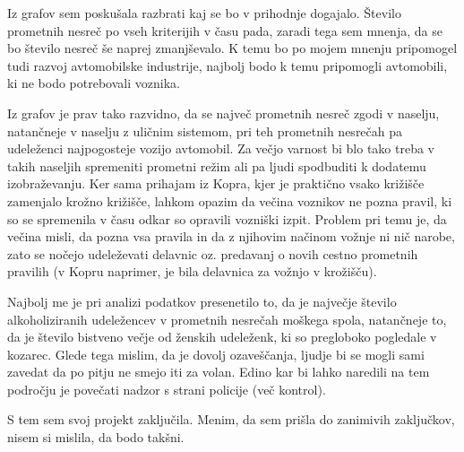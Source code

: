 \documentclass[11pt,a4paper]{article}
\begin{document}
Iz grafov sem poskušala razbrati kaj se bo v prihodnje dogajalo. Število prometnih nesreč po vseh kriterijih v času pada, zaradi tega sem mnenja, da se bo število nesreč še naprej zmanjševalo. K temu bo po mojem mnenju pripomogel tudi razvoj avtomobilske industrije, najbolj bodo k temu pripomogli avtomobili, ki ne bodo potrebovali voznika. \par
Iz grafov je prav tako razvidno, da se največ prometnih nesreč zgodi v naselju, natančneje v naselju z uličnim sistemom, pri teh prometnih nesrečah pa udeleženci najpogosteje vozijo avtomobil. Za večjo varnost bi blo tako treba v takih naseljih spremeniti prometni režim ali pa ljudi spodbuditi k dodatemu izobraževanju. Ker sama prihajam iz Kopra, kjer je praktično vsako križišče zamenjalo krožno križišče, lahkom opazim da večina voznikov ne pozna pravil, ki so se spremenila v času odkar so opravili vozniški izpit. Problem pri temu je, da večina misli, da pozna vsa pravila in da z njihovim načinom vožnje ni nič narobe, zato se nočejo udeleževati delavnic oz. predavanj o novih cestno prometnih pravilih (v Kopru naprimer, je bila delavnica za vožnjo v krožišču). \par
Najbolj me je pri analizi podatkov presenetilo to, da je največje število alkoholiziranih udeležencev v prometnih nesrečah moškega spola, natančneje to, da je število bistveno večje od ženskih udeleženk, ki so pregloboko pogledale v kozarec. Glede tega mislim, da je dovolj ozaveščanja, ljudje bi se mogli sami zavedat da po pitju ne smejo iti za volan. Edino kar bi lahko naredili na tem področju je povečati nadzor s strani policije (več kontrol). \par
S tem sem svoj projekt zaključila. Menim, da sem prišla do zanimivih zaključkov, nisem si mislila, da bodo takšni.
\end{document}
